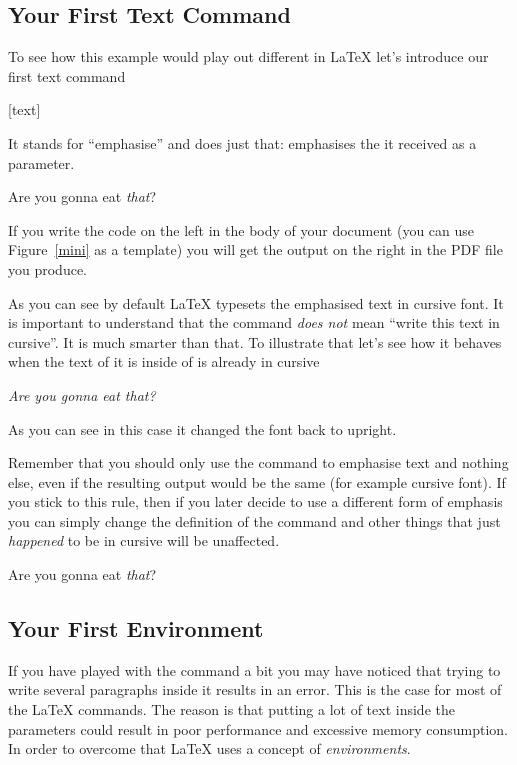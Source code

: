 \subsection{Your First Text Command}

To see how this example would play out different in \LaTeX{} let's introduce
our first text command
\begin{lscommand}
  [text]
\end{lscommand}
It stands for \enquote{emphasise} and does just that: emphasises the
 it received as a parameter.
\begin{example}
Are you gonna eat \emph{that}?
\end{example}
If you write the code on the left in the body of your document (you can use
Figure~\ref{mini} as a template) you will get the output on the right in the
PDF file you produce.

As you can see by default \LaTeX{} typesets the emphasised text in cursive
font. It is important to understand that the  command \emph{does not}
mean \enquote{write this text in cursive}. It is much smarter than that. To
illustrate that let's see how it behaves when the text of it is inside of is
already in cursive
\begin{example}
  \itshape%
Are you gonna eat \emph{that}?
\end{example}
As you can see in this case it changed the font back to upright.

Remember that you should only use the  command to emphasise text and
nothing else, even if the resulting output would be the same (for example
cursive font). If you stick to this rule, then if you later decide to use a
different form of emphasis you can simply change the definition of the
 command and other things that just \emph{happened} to be in cursive
will be unaffected.
\begin{example}
  \RenewCommandCopy{\emph}{\strong}%
Are you gonna eat \emph{that}?
\end{example}

\subsection{Your First Environment}

If you have played with the  command a bit you may have noticed that
trying to write several paragraphs inside it results in an error. This is the
case for most of the \LaTeX{} commands. The reason is that putting a lot of
text inside the parameters could result in poor performance and excessive
memory consumption. In order to overcome that \LaTeX{} uses a concept of
\emph{environments}.

